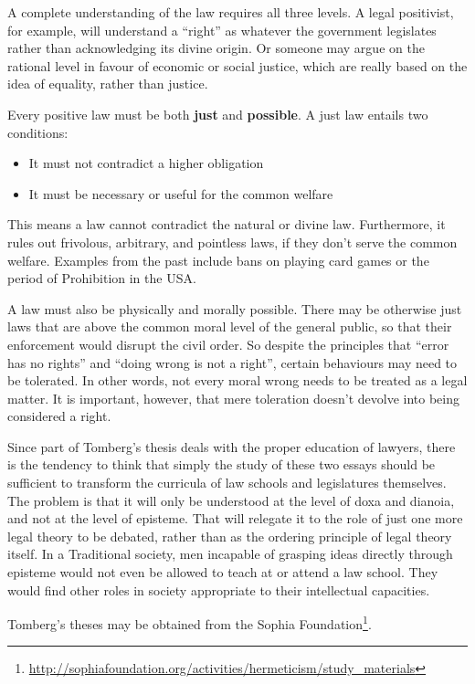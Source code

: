 A complete understanding of the law requires all three levels. A legal positivist, for example, will understand a ``right'' as whatever the government legislates rather than acknowledging its divine origin. Or someone may argue on the rational level in favour of economic or social justice, which are really based on the idea of equality, rather than justice.

Every positive law must be both \textbf{just} and \textbf{possible}. A just law entails two conditions:

\begin{itemize}


\item It must not contradict a higher obligation

\item It must be necessary or useful for the common welfare
\end{itemize}


This means a law cannot contradict the natural or divine law. Furthermore, it rules out frivolous, arbitrary, and pointless laws, if they don't serve the common welfare. Examples from the past include bans on playing card games or the period of Prohibition in the USA.

A law must also be physically and morally possible. There may be otherwise just laws that are above the common moral level of the general public, so that their enforcement would disrupt the civil order. So despite the principles that ``error has no rights'' and ``doing wrong is not a right'', certain behaviours may need to be tolerated. In other words, not every moral wrong needs to be treated as a legal matter. It is important, however, that mere toleration doesn't devolve into being considered a right.

Since part of Tomberg's thesis deals with the proper education of lawyers, there is the tendency to think that simply the study of these two essays should be sufficient to transform the curricula of law schools and legislatures themselves. The problem is that it will only be understood at the level of doxa and dianoia, and not at the level of episteme. That will relegate it to the role of just one more legal theory to be debated, rather than as the ordering principle of legal theory itself. In a Traditional society, men incapable of grasping ideas directly through episteme would not even be allowed to teach at or attend a law school. They would find other roles in society appropriate to their intellectual capacities.

Tomberg's theses may be obtained from the Sophia Foundation\footnote{\url{http://sophiafoundation.org/activities/hermeticism/study_materials}}.




